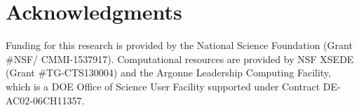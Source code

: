 \documentclass[12pt,authoryear]{elsarticle}
\begin{document}
\section{Acknowledgments}
\label{sec:acknowledgement}
Funding for this research is provided by the National Science Foundation (Grant
\#NSF/ CMMI-1537917). Computational resources are provided by NSF XSEDE (Grant
\#TG-CTS130004) and the Argonne Leadership Computing Facility, which is a DOE
Office of Science User Facility supported under Contract DE-AC02-06CH11357.

 

\end{document}
